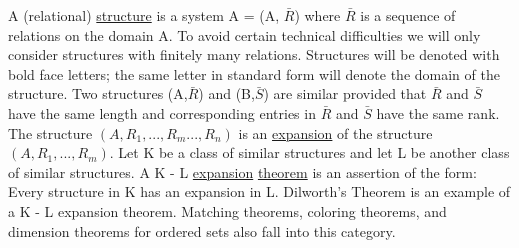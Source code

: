 \documentclass[twoside]{article}
\begin{document}
\newpage
%
%
A (relational) \underline{structure} is a system   A = (A, $\bar{R}$)   where   $\bar{R}$   is a sequence of relations on the domain   A.   
To avoid certain technical difficulties we will only consider structures with finitely many relations.    
Structures will be denoted with bold face letters;  the same letter in standard form will denote the domain of the structure.   
Two structures (A,$\bar{R}$)   and   (B,$\bar{S}$) are similar    provided that   $\bar{R}$   and   $\bar{S}$ have    the same length and corresponding entries in   $\bar{R}$   and    $\bar{S}$   have the same rank.    The structure
$(A,R_1,...,R_m...,R_n)$    is an \underline{expansion} of  the structure    $(A,R_1,...,R_m)$.    
Let K be a class of similar structures and let   L   be another class of similar structures.   
A   K - L   \underline{expansion} \underline{theorem} is an assertion of the form: Every structure in   K   has an expansion in   L.    Dilworth's Theorem is an example of a   K - L   expansion theorem. Matching theorems, coloring theorems, and dimension theorems for ordered sets also fall into this category.
\end{document}
